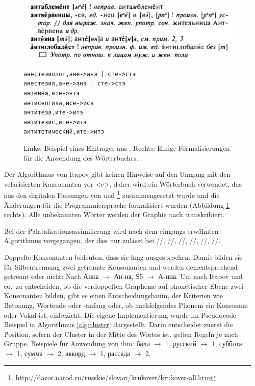 \documentclass[12pt,headsepline,a4paper]{scrartcl}
\newcommand\textcyr[1]{{\fontencoding{OT2}\fontfamily{wncyr}\selectfont #1}}
\begin{document}
\begin{figure}[htbp]
\begin{minipage}{0.65\textwidth}
\includegraphics[width=\textwidth]{figures/orfo_example}
\end{minipage}
\begin{minipage}{0.3\textwidth}
\begingroup
{}\fontsize{9pt}{12pt}\selectfont
\begin{Verbatim}
анестезиолог,ане->анэ | сте->стэ
анестезия,ане->анэ | сте->стэ
антенна,нте->нтэ
антисептика,исе->исэ
антитеза,ите->итэ
антитезис,ите->итэ
антитетический,ите->итэ
\end{Verbatim}
\endgroup
\end{minipage}
\caption{Links: Beispiel eines Eintrages aus \textcite[33]{rezni2005}. Rechts: Einige Formalisierungen für die Anwendung des Wörterbuches.}
\label{fig: orfo_example}
\end{figure}

Der Algorithmus von Itapov gibt keinen Hinweise auf den Umgang mit den velarisierten Konsonanten vor <e>, daher wird ein Wörterbuch verwendet, das aus den digitalen Fassungen von \textcite{rezni2005} und \textcite{kruk2008}\footnote{http://dazor.narod.ru/russkie/slovari/krukover/krukover-all.htm} zusammengesetzt wurde und die Änderungen für die Programmiersprache formalisiert wurden (Abbildung \ref{fig: orfo_example} rechts). Alle unbekannten Wörter werden der Graphie nach transkribiert. 

Bei der Palatalisationsassimilierung wird nach dem eingangs erwähnten Algorithmus vorgegangen, der dies nur zulässt bei //, //, //, //, //, //.

Doppelte Konsonanten bedeuten, dass sie lang ausgesprochen. Damit bilden sie für Silbentrennung zwei getrennte Konsonanten und werden dementsprechend getrennt oder nicht: Nach \textcite{vino1953} \textcyr{Анна} $\to$ \textcyr{Ан-на}, S5 $\to$ \textcyr{А-нна}. Um nach Itapov und co.\ zu entscheiden, ob die verdoppelten Grapheme auf phonetischer Ebene zwei Konsonanten bilden, gibt es einen Entscheidungsbaum, der Kriterien wie Betonung, Wortende oder -anfang oder, ob nachfolgendes Phonem ein Konsonant oder Vokal ist, einbezieht. Die eigene Implementierung wurde im Pseudocode-Beispiel in Algorithmus \ref{alg:cluster} dargestellt. Darin entscheidet zuerst die Position; sofern der Cluster in der Mitte des Wortes ist, gelten Regeln je nach Gruppe. Beispiele für Anwendung von ihm: \textcyr{балл $\to$ 1, русский $\to$ 1, суббота $\to$ 1, сумма $\to$ 2, аккорд $\to$ 1, рассада $\to$ 2}.
\end{document}
